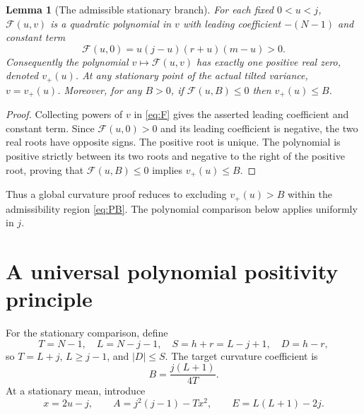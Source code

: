 \documentclass[11pt,a4paper]{article}
\newtheorem{lemma}[theorem]{Lemma}
\begin{document}
\begin{lemma}[The admissible stationary branch]\label{lem:branch}
For each fixed $0<u<j$, $\mathcal F(u,v)$ is a quadratic polynomial in $v$ with leading coefficient $-(N-1)$ and constant term
\begin{equation}\label{eq:F0}
 \mathcal F(u,0)=u(j-u)(r+u)(m-u)>0.
\end{equation}
Consequently the polynomial $v\mapsto\mathcal F(u,v)$ has exactly one positive real zero, denoted $v_+(u)$. At any stationary point of the actual tilted variance, $v=v_+(u)$. Moreover, for any $B>0$, if $\mathcal F(u,B)\le0$ then $v_+(u)\le B$.
\end{lemma}
\begin{proof}
Collecting powers of $v$ in \eqref{eq:F} gives the asserted leading coefficient and constant term. Since $\mathcal F(u,0)>0$ and its leading coefficient is negative, the two real roots have opposite signs. The positive root is unique. The polynomial is positive strictly between its two roots and negative to the right of the positive root, proving that $\mathcal F(u,B)\le0$ implies $v_+(u)\le B$.
\end{proof}

Thus a global curvature proof reduces to excluding $v_+(u)>B$ within the admissibility region \eqref{eq:PB}. The polynomial comparison below applies uniformly in $j$.
\section{A universal polynomial positivity principle}\label{sec:positive}
For the stationary comparison, define
\begin{equation}\label{eq:letters}
 T=N-1,\quad L=N-j-1,\quad S=h+r=L-j+1,\quad D=h-r,
\end{equation}
so $T=L+j$, $L\ge j-1$, and $|D|\le S$. The target curvature coefficient is
\[
 B=\frac{j(L+1)}{4T}.
\]
At a stationary mean, introduce
\begin{equation}\label{eq:AandE}
 x=2u-j,\qquad A=j^2(j-1)-Tx^2,
 \qquad E=L(L+1)-2j.
\end{equation}
\end{document}
